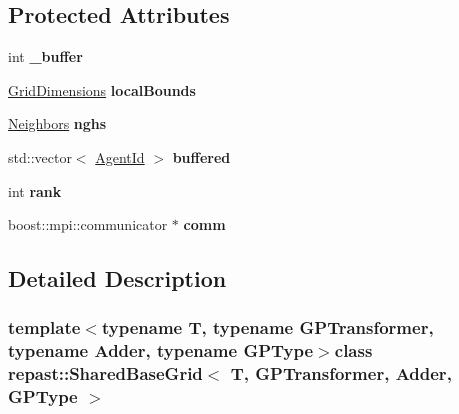 \subsection*{Protected Attributes}
\begin{DoxyCompactItemize}
\item 
\hypertarget{classrepast_1_1_shared_base_grid_a2e19f6831a277a4df1373920ea57d8eb}{int {\bfseries \-\_\-buffer}}\label{classrepast_1_1_shared_base_grid_a2e19f6831a277a4df1373920ea57d8eb}

\item 
\hypertarget{classrepast_1_1_shared_base_grid_aa9ea56859b5278b0d6bc2bbd8ab4c46b}{\hyperlink{classrepast_1_1_grid_dimensions}{Grid\-Dimensions} {\bfseries local\-Bounds}}\label{classrepast_1_1_shared_base_grid_aa9ea56859b5278b0d6bc2bbd8ab4c46b}

\item 
\hypertarget{classrepast_1_1_shared_base_grid_a204f5c23dd15d124d558140cc1571e7c}{\hyperlink{classrepast_1_1_neighbors}{Neighbors} {\bfseries nghs}}\label{classrepast_1_1_shared_base_grid_a204f5c23dd15d124d558140cc1571e7c}

\item 
\hypertarget{classrepast_1_1_shared_base_grid_aaa8d5d36ce831a360a88c0149f40cd77}{std\-::vector$<$ \hyperlink{classrepast_1_1_agent_id}{Agent\-Id} $>$ {\bfseries buffered}}\label{classrepast_1_1_shared_base_grid_aaa8d5d36ce831a360a88c0149f40cd77}

\item 
\hypertarget{classrepast_1_1_shared_base_grid_a48f63bb491afa1078c8d6598b32b5e3e}{int {\bfseries rank}}\label{classrepast_1_1_shared_base_grid_a48f63bb491afa1078c8d6598b32b5e3e}

\item 
\hypertarget{classrepast_1_1_shared_base_grid_ab9c405f324b799fa0b5fc7472cf6ab49}{boost\-::mpi\-::communicator $\ast$ {\bfseries comm}}\label{classrepast_1_1_shared_base_grid_ab9c405f324b799fa0b5fc7472cf6ab49}

\end{DoxyCompactItemize}


\subsection{Detailed Description}
\subsubsection*{template$<$typename T, typename G\-P\-Transformer, typename Adder, typename G\-P\-Type$>$class repast\-::\-Shared\-Base\-Grid$<$ T, G\-P\-Transformer, Adder, G\-P\-Type $>$}


